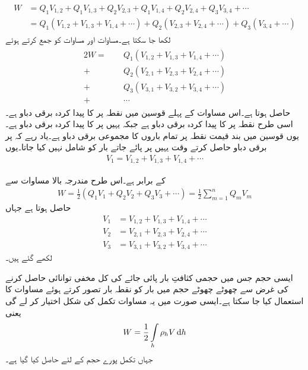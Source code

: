 \begin{gather}
\begin{aligned}\label{مساوات_توانائی_بار_کثافت_توانائی_ب}
W&=Q_1 V_{1,2}+Q_1 V_{1,3} +Q_2 V_{2,3}+Q_1 V_{1,4} +Q_2 V_{2,4}+Q_3 V_{3,4}+\cdots\\
&=Q_1 (V_{1,2}+V_{1,3} + V_{1,4} +\cdots)+Q_2 (V_{2,3}+V_{2,4}+\cdots)+Q_3(V_{3,4}+\cdots)
\end{aligned}
\end{gather}
  لکھا جا سکتا ہے۔مساوات  اور مساوات  کو جمع کرتے ہوئے
\begin{gather}
\begin{aligned}
2 W=\phantom{+}&Q_1(V_{1,2}+V_{1,3} + V_{1,4} +\cdots)\\
+&Q_2 (V_{2,1}+V_{2,3}+V_{2,4}+\cdots)\\
+&Q_3( V_{3,1}+V_{3,2}+V_{3,4}+\cdots)\\
+&\cdots
\end{aligned}
\end{gather}
حاصل ہوتا ہے۔اس مساوات کے پہلے قوسین میں  نقطہ  پر  کا پیدا کردہ برقی دباو ہے۔اسی طرح  نقطہ  پر  کا پیدا کردہ برقی دباو ہے جبکہ  یہیں پر  کا پیدا کردہ برقی دباو ہے۔یوں قوسین میں بند قیمت نقطہ  پر تمام باروں کا مجموعی برقی دباو  ہے۔یاد رہے کہ  پر برقی دباو حاصل کرتے وقت یہیں پر پائے جاتے بار  کو شامل نہیں کیا جاتا۔یوں
\begin{align*}
V_1=V_{1,2}+V_{1,3} + V_{1,4} +\cdots
\end{align*}

کے برابر ہے۔اس طرح مندرجہ بالا مساوات سے
\begin{align}\label{مساوات_توانائی_بار_کثافت_توانائی_پ}
W=\frac{1}{2}\left(Q_1 V_1+Q_2 V_2+Q_3 V_3+\cdots\right)=\frac{1}{2}\sum_{m=1}^{n} Q_m V_m
\end{align}
حاصل ہوتا ہے جہاں 
\begin{align*}
V_1&=V_{1,2}+V_{1,3} + V_{1,4} +\cdots\\
V_2&=V_{2,1}+V_{2,3}+V_{2,4}+\cdots\\
V_3&=V_{3,1}+V_{3,2}+V_{3,4}+\cdots
\end{align*}
لکھے گئے ہیں۔

ایسی حجم جس میں حجمی کثافتِ بار  پائی جائے کی کل مخفی توانائی حاصل کرنے کی غرض سے  چھوٹے چھوٹے حجم  میں بار  کو نقطہ بار تصور کرتے ہوئے مساوات  کا استعمال کیا جا سکتا ہے۔ایسی صورت میں یہ مساوات تکمل کی شکل اختیار کر لے گی یعنی
 \begin{align}\label{مساوات_توانائی_کثافت_توانائی}
W=\frac{1}{2}\int \limits_h \rho_h V \dif h
\end{align}
جہاں تکمل پورے حجم  کے لئے حاصل کیا گیا ہے۔


